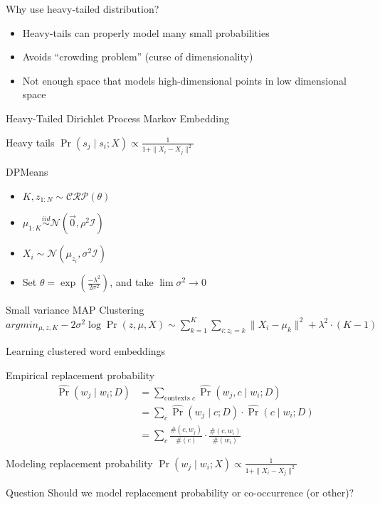 \documentclass{beamer}
\begin{document}
\begin{frame}{Why use heavy-tailed distribution?}
  \begin{itemize}
    \item Heavy-tails can properly model many small probabilities
    \item Avoids ``crowding problem'' (curse of dimensionality)
    \item Not enough space that models high-dimensional points in low dimensional space
  \end{itemize}
\end{frame}

\begin{frame}{Heavy-Tailed Dirichlet Process Markov Embedding}
   \begin{block}{Heavy tails}
    $\Pr(s_j \mid s_i ; X) \propto \frac{1}{1 + \| X_i - X_j \|^2}$
   \end{block}
  \begin{block}{DPMeans \cite{DPMeans}}
  \begin{itemize}
	\item $K, z_{1 \colon N} \sim \mathcal{CRP}(\theta)$
	\item $\mu_{1 \colon K} \overset{iid}{\sim} \mathcal{N}(\vec{0}, \rho^2 \mathcal{I})$
	\item $X_i \sim \mathcal{N}(\mu_{z_i}, \sigma^2 \mathcal{I})$
	\item Set $\theta = \exp(\frac{-\lambda^2}{2 \sigma^2})$, and take $\lim \sigma^2 \rightarrow 0$
  \end{itemize}
  \end{block}
  \begin{block}{Small variance MAP Clustering}
	$argmin_{\mu, z, K} -2 \sigma^2 \log \Pr(z, \mu, X) \sim \sum_{k=1}^K \sum_{i : z_i = k} \| X_i - \mu_k \|^2 + \lambda^2 \cdot (K - 1)$
  \end{block}
\end{frame}

\begin{frame}{Learning clustered word embeddings}
  \begin{block}{Empirical replacement probability}
  \begin{align*}
   \hat{\Pr}(w_j \mid w_i ; D) &= \sum_{\text{contexts } c} \hat{\Pr}(w_j, c \mid w_i ; D)\\
    & = \sum_c \hat{\Pr}(w_j \mid c ; D) \cdot \hat{\Pr}(c \mid w_i ; D) \\
    & = \sum_c \frac{\#(c, w_j)}{\#(c)} \cdot \frac{\#(c, w_i)}{\#(w_i)}
  \end{align*}
  \end{block}
  \begin{block}{Modeling replacement probability}
          $\Pr(w_j \mid w_i ; X) \propto \frac{1}{1 + \| X_i - X_j \|^2}$
  \end{block}
  \pause
  \begin{alertblock}{Question}
	Should we model replacement probability or co-occurrence (or other)?
  \end{alertblock}
\end{frame}
\end{document}
